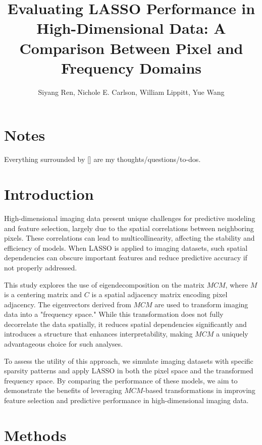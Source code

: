 \documentclass[12pt]{article}
\begin{document}
\title{Evaluating LASSO Performance in High-Dimensional Data: A Comparison Between Pixel and Frequency Domains}
\author{Siyang Ren, Nichole E. Carlson, William Lippitt, Yue Wang}
\date{}
\maketitle


\section*{Notes}

Everything surrounded by [] are my thoughts/questions/to-dos.


\section{Introduction}

High-dimensional imaging data present unique challenges for predictive modeling and feature selection, largely due to the spatial correlations between neighboring pixels. These correlations can lead to multicollinearity, affecting the stability and efficiency of models. When LASSO is applied to imaging datasets, such spatial dependencies can obscure important features and reduce predictive accuracy if not properly addressed.

This study explores the use of eigendecomposition on the matrix \( MCM \), where \( M \) is a centering matrix and \( C \) is a spatial adjacency matrix encoding pixel adjacency. The eigenvectors derived from \( MCM \) are used to transform imaging data into a "frequency space." While this transformation does not fully decorrelate the data spatially, it reduces spatial dependencies significantly and introduces a structure that enhances interpretability, making \( MCM \) a uniquely advantageous choice for such analyses.

To assess the utility of this approach, we simulate imaging datasets with specific sparsity patterns and apply LASSO in both the pixel space and the transformed frequency space. By comparing the performance of these models, we aim to demonstrate the benefits of leveraging \( MCM \)-based transformations in improving feature selection and predictive performance in high-dimensional imaging data.



\section{Methods}
\end{document}
